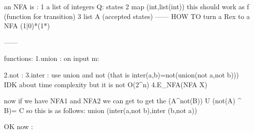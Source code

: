 an NFA is :
1 a list of integers Q: states
2 map (int,list(int)) this should work as f (function for transition)
3 list A (accepted states)
------
HOW TO turn a Rex to a NFA 
(1|0)*(1*)


------

functions:
1.union : 
on input m:
    
2.not   :
3.inter : use union and not (that is inter(a,b)=not(union(not a,not  b)))
IDK about time complexity but it is not O(2^n)
4.E_NFA(NFA X)


now if we have NFA1 and NFA2  we can get 
to get the (A^not(B)) U (not(A) ^ B)= C
so this is as follows:
union (inter(a,not b),inter (b,not a))

OK now :